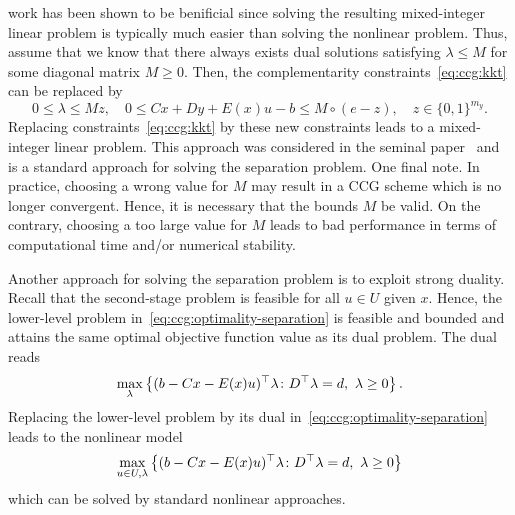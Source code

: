 work has been shown to be benificial since solving the resulting mixed-integer
linear problem is typically much easier than solving the nonlinear problem.
Thus, assume that we know that there always exists dual solutions satisfying
$\lambda \le M$ for some diagonal matrix $M \ge 0$. Then, the complementarity
constraints~\eqref{eq:ccg:kkt} can be replaced by
\begin{equation*}
    0 \le \lambda \le Mz, \quad 
    0 \le Cx + Dy + E(x)u - b \le M\circ(e - z), \quad 
    z\in\{0,1\}^{m_y}.
\end{equation*}
Replacing constraints~\eqref{eq:ccg:kkt} by these new constraints leads to a
mixed-integer linear problem. This approach was considered in the seminal
paper~\textcite{Zeng2013} and is a standard approach for solving the
separation problem. One final note. In practice, choosing a wrong value for
$M$ may result in a CCG scheme which is no longer convergent. Hence, it is
necessary that the bounds $M$ be valid. On the contrary, choosing a too large
value for $M$ leads to bad performance in terms of computational time and/or
numerical stability. 


Another approach for solving the separation problem is to exploit strong
duality. Recall that the second-stage problem is feasible for all $u\in U$
given $x$. Hence, the lower-level problem
in~\eqref{eq:ccg:optimality-separation} is feasible and bounded and attains
the same optimal objective function value as its dual problem. The dual reads
\begin{equation*}
    \max_{\lambda} \left\{ (b - Cx - E(x)u)^\top\lambda \colon D^\top \lambda = d, \ \lambda \ge 0 \right\}.
\end{equation*}
Replacing the lower-level problem by its dual
in~\eqref{eq:ccg:optimality-separation} leads to the nonlinear model
\begin{equation}
    \label{eq:ccg:optimality-duality-separation}
    \max_{u\in U, \lambda} \left\{ (b - Cx - E(x)u)^\top\lambda \colon D^\top \lambda = d, \ \lambda \ge 0 \right\}
\end{equation}
which can be solved by standard nonlinear approaches. 


